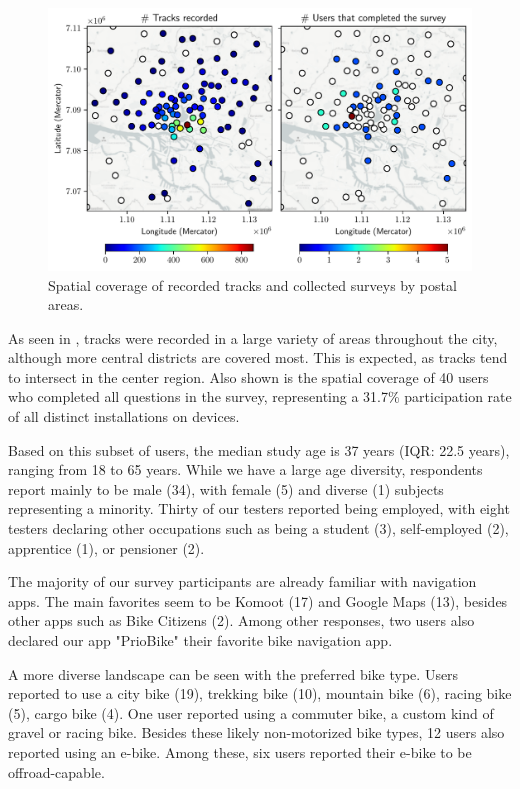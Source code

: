 \begin{figure}[t]
\caption{Spatial coverage of recorded tracks and collected surveys by postal areas.}\label{fig:app-spatial-distribution}
\includegraphics[width=\linewidth]{images/app-spatial-distribution.pdf}
\end{figure}

As seen in , tracks were recorded in a large variety of areas throughout the city, although more central districts are covered most. This is expected, as tracks tend to intersect in the center region. Also shown is the spatial coverage of 40 users who completed all questions in the survey, representing a 31.7\% participation rate of all distinct installations on devices.

Based on this subset of users, the median study age is 37 years (IQR: 22.5 years), ranging from 18 to 65 years. While we have a large age diversity, respondents report mainly to be male (34), with female (5) and diverse (1) subjects representing a minority. Thirty of our testers reported being employed, with eight testers declaring other occupations such as being a student (3), self-employed (2), apprentice (1), or pensioner (2).

The majority of our survey participants are already familiar with navigation apps. The main favorites seem to be Komoot (17) and Google Maps (13), besides other apps such as Bike Citizens (2). Among other responses, two users also declared our app "PrioBike" their favorite bike navigation app. 

A more diverse landscape can be seen with the preferred bike type. Users reported to use a city bike (19), trekking bike (10), mountain bike (6), racing bike (5), cargo bike (4). One user reported using a commuter bike, a custom kind of gravel or racing bike. Besides these likely non-motorized bike types, 12 users also reported using an e-bike. Among these, six users reported their e-bike to be offroad-capable. 

